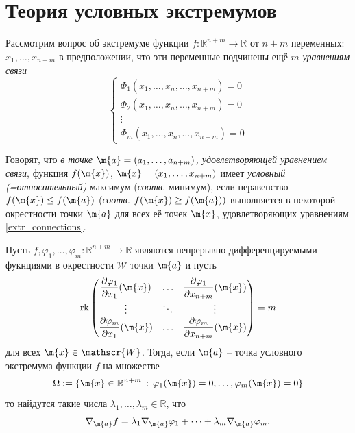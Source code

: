 \section{Теория условных экстремумов}

Рассмотрим вопрос об экстремуме функции $f:\mathbb{R}^{n+m} \to \mathbb{R}$ от $n+m$ переменных: $x_1,\ldots, x_{n+m}$ в предположении, что эти переменные подчинены ещё $m$ \textit{уравнениям связи}
\begin{equation}\label{extr_connections}
   \left\{\begin{matrix}
       \Phi_1(x_1,\ldots, x_{n}, \ldots, x_{n+m}) = 0 \\
       \Phi_2(x_1,\ldots, x_{n}, \ldots, x_{n+m}) = 0 \\
       \vdots\\
       \Phi_m(x_1,\ldots, x_{n}, \ldots, x_{n+m}) = 0
   \end{matrix} \right.   
\end{equation}

\begin{definition}
    Говорят, что \textit{в точке $\m{a} = (a_1,\ldots, a_{n+m})$, удовлетворяющей уравнением связи}, функция $f(\m{x})$, $\m{x} = (x_1,\ldots, x_{n+m})$ имеет \textit{условный (=относительный)} максимум (\textit{соотв.} минимум), если неравенство $f(\m{x}) \le f(\m{a})$ (\textit{соотв.} $f(\m{x}) \ge f(\m{a}))$ выполняется в некоторой окрестности точки $\m{a}$ для всех её точек $\m{x}$, удовлетворяющих уравнениям \ref{extr_connections}.
\end{definition}

\begin{theorem} Пусть $f, \varphi_1,\ldots, \varphi_m: \mathbb{R}^{n+m} \to \mathbb{R}$ являются непрерывно дифференцируемыми фукнциями в окрестности $\mathscr{W}$ точки $\m{a}$ и пусть 
    \[
     \mathrm{rk} \begin{pmatrix}
         \dfrac{\partial \varphi_1}{\partial x_1} (\m{x}) & \ldots & \dfrac{\partial \varphi_1}{\partial x_{n+m}} (\m{x}) \\
         \vdots & \ddots & \vdots \\
         \dfrac{\partial \varphi_m}{\partial x_1} (\m{x}) & \ldots & \dfrac{\partial \varphi_m}{\partial x_{n+m}} (\m{x})
     \end{pmatrix} = m
    \]
    для всех $\m{x}\in \mathscr{W}$. Тогда, если $\m{a}$ -- точка условного экстремума функции $f$ на множестве
    \[
     \Omega: = \{\m{x} \in \mathbb{R}^{n+m}\,:\, \varphi_1(\m{x}) =0, \ldots, \varphi_m(\m{x}) = 0\}
    \]
    то найдутся такие числа $\lambda_1,\ldots, \lambda_m \in \mathbb{R}$, что
    \[
     \nabla_\m{a} f = \lambda_1 \nabla_\m{a} \varphi_1 + \cdots +   \lambda_m \nabla_\m{a} \varphi_m.
     \]
\end{theorem}


